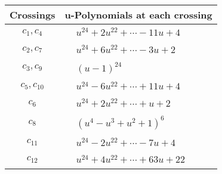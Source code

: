 \documentclass[1p]{elsarticle_modified}
\theoremstyle{definition}
\begin{document}
\begin{tabular}{m{50pt}|m{274pt}}
Crossings & \hspace{64pt}u-Polynomials at each crossing \\
\hline $$\begin{aligned}c_{1},c_{4}\end{aligned}$$&$\begin{aligned}
&u^{24}+2 u^{22}+\cdots-11 u+4
\end{aligned}$\\
\hline $$\begin{aligned}c_{2},c_{7}\end{aligned}$$&$\begin{aligned}
&u^{24}+6 u^{22}+\cdots-3 u+2
\end{aligned}$\\
\hline $$\begin{aligned}c_{3},c_{9}\end{aligned}$$&$\begin{aligned}
&(u-1)^{24}
\end{aligned}$\\
\hline $$\begin{aligned}c_{5},c_{10}\end{aligned}$$&$\begin{aligned}
&u^{24}-6 u^{22}+\cdots+11 u+4
\end{aligned}$\\
\hline $$\begin{aligned}c_{6}\end{aligned}$$&$\begin{aligned}
&u^{24}+2 u^{22}+\cdots+u+2
\end{aligned}$\\
\hline $$\begin{aligned}c_{8}\end{aligned}$$&$\begin{aligned}
&(u^4- u^3+u^2+1)^6
\end{aligned}$\\
\hline $$\begin{aligned}c_{11}\end{aligned}$$&$\begin{aligned}
&u^{24}-2 u^{22}+\cdots-7 u+4
\end{aligned}$\\
\hline $$\begin{aligned}c_{12}\end{aligned}$$&$\begin{aligned}
&u^{24}+4 u^{22}+\cdots+63 u+22
\end{aligned}$\\
\hline
\end{tabular}\\~\\
\end{document}
